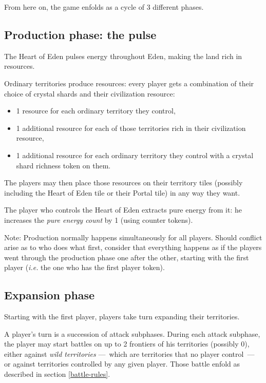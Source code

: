 \documentclass[a4paper]{article}
\begin{document}
    From here on, the game enfolds as a cycle of 3 different phases.
    
    \subsection{Production phase: the pulse}
        \label{prod}
        The Heart of Eden pulses energy throughout Eden,
        making the land rich in resources.
        
        Ordinary territories produce resources:
        every player gets a combination of their choice of crystal shards
        and their civilization resource:
        \vspace{-1.3em}
        \begin{itemize}
            \item 1 resource for each ordinary territory they control,
            \item 1 additional resource for each of those territories
                rich in their civilization resource,
            \item 1 additional resource for each ordinary territory they control
                with a crystal shard richness token on them.
        \end{itemize}
        
        The players may then place those resources on their territory tiles
        (possibly including the Heart of Eden tile or their Portal tile)
        in any way they want.
        
        The player who controls the Heart of Eden extracts pure energy from it:
        he increases the \textit{pure energy count} by 1
        (using counter tokens).
        
        Note: Production normally happens simultaneously for all players.
        Should conflict arise as to who does what first,
        consider that everything happens as if the players went through
        the production phase one after the other, starting with the first player
        (\textit{i.e.} the one who has the first player token).

    \subsection{Expansion phase}
        \label{expansion}    
        Starting with the first player,
        players take turn expanding their territories.
        
        A player's turn is a succession of attack subphases.
        During each attack subphase, the player may start battles
        on up to 2 frontiers of his territories (possibly 0),
        either against \textit{wild territories}
        ---~which are territories that no player control~---
        or against territories controlled by any given player.
        Those battle enfold as described in section \ref{battle-rules}.
        
\end{document}
